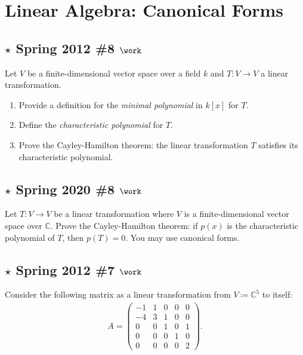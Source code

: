 \hypertarget{linear-algebra-canonical-forms}{%
\section{Linear Algebra: Canonical
Forms}\label{linear-algebra-canonical-forms}}

\hypertarget{star-spring-2012-8-work}{%
\subsection{\texorpdfstring{\(\star\) Spring 2012 \#8
\(\work\)}{\textbackslash star Spring 2012 \#8 \textbackslash work}}\label{star-spring-2012-8-work}}

Let \(V\) be a finite-dimensional vector space over a field \(k\) and
\(T:V\to V\) a linear transformation.

\begin{enumerate}
\def\labelenumi{\alph{enumi}.}
\item
  Provide a definition for the \emph{minimal polynomial} in \(k[x]\) for
  \(T\).
\item
  Define the \emph{characteristic polynomial} for \(T\).
\item
  Prove the Cayley-Hamilton theorem: the linear transformation \(T\)
  satisfies its characteristic polynomial.
\end{enumerate}

\hypertarget{star-spring-2020-8-work}{%
\subsection{\texorpdfstring{\(\star\) Spring 2020 \#8
\(\work\)}{\textbackslash star Spring 2020 \#8 \textbackslash work}}\label{star-spring-2020-8-work}}

Let \(T:V\to V\) be a linear transformation where \(V\) is a
finite-dimensional vector space over \({\mathbb{C}}\). Prove the
Cayley-Hamilton theorem: if \(p(x)\) is the characteristic polynomial of
\(T\), then \(p(T) = 0\). You may use canonical forms.

\hypertarget{star-spring-2012-7-work}{%
\subsection{\texorpdfstring{\(\star\) Spring 2012 \#7
\(\work\)}{\textbackslash star Spring 2012 \#7 \textbackslash work}}\label{star-spring-2012-7-work}}

Consider the following matrix as a linear transformation from
\(V\coloneqq{\mathbb{C}}^5\) to itself:
\begin{align*}
A=\left(\begin{array}{ccccc}
-1 & 1 & 0 & 0 & 0 \\
-4 & 3 & 1 & 0 & 0 \\
0 & 0 & 1 & 0 & 1 \\
0 & 0 & 0 & 1 & 0 \\
0 & 0 & 0 & 0 & 2
\end{array}\right)
.\end{align*}

